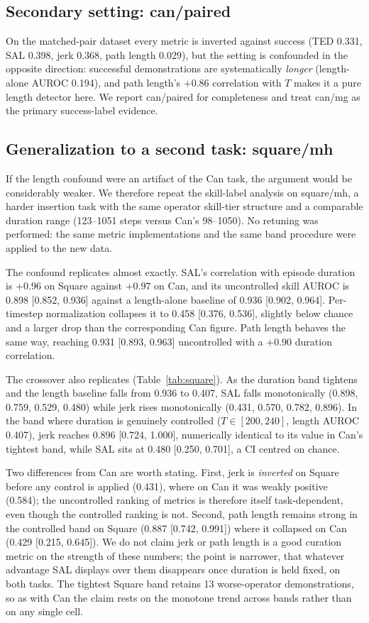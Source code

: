 \documentclass[10pt]{article}
\begin{document}
\subsection{Secondary setting: can/paired}

On the matched-pair dataset every metric is inverted against success (TED
0.331, SAL 0.398, jerk 0.368, path length 0.029), but the setting is
confounded in the opposite direction: successful demonstrations are
systematically \emph{longer} (length-alone AUROC 0.194), and path length's
$+0.86$ correlation with $T$ makes it a pure length detector here. We
report can/paired for completeness and treat can/mg as the primary
success-label evidence.

\subsection{Generalization to a second task: square/mh}
\label{sec:square}

If the length confound were an artifact of the Can task, the argument would
be considerably weaker. We therefore repeat the skill-label analysis on
square/mh, a harder insertion task with the same operator skill-tier
structure and a comparable duration range (123--1051 steps versus Can's
98--1050). No retuning was performed: the same metric implementations and
the same band procedure were applied to the new data.

The confound replicates almost exactly. SAL's correlation with episode
duration is $+0.96$ on Square against $+0.97$ on Can, and its uncontrolled
skill AUROC is 0.898 [0.852, 0.936] against a length-alone baseline of 0.936
[0.902, 0.964]. Per-timestep normalization collapses it to 0.458 [0.376,
0.536], slightly below chance and a larger drop than the corresponding Can
figure. Path length behaves the same way, reaching 0.931 [0.893, 0.963]
uncontrolled with a $+0.90$ duration correlation.

The crossover also replicates (Table~\ref{tab:square}). As the duration band
tightens and the length baseline falls from 0.936 to 0.407, SAL falls
monotonically (0.898, 0.759, 0.529, 0.480) while jerk rises monotonically
(0.431, 0.570, 0.782, 0.896). In the band where duration is genuinely
controlled ($T \in [200,240]$, length AUROC 0.407), jerk reaches 0.896
[0.724, 1.000], numerically identical to its value in Can's tightest band,
while SAL sits at 0.480 [0.250, 0.701], a CI centred on chance.

Two differences from Can are worth stating. First, jerk is \emph{inverted}
on Square before any control is applied (0.431), where on Can it was weakly
positive (0.584); the uncontrolled ranking of metrics is therefore itself
task-dependent, even though the controlled ranking is not. Second, path
length remains strong in the controlled band on Square (0.887 [0.742,
0.991]) where it collapsed on Can (0.429 [0.215, 0.645]). We do not claim
jerk or path length is a good curation metric on the strength of these
numbers; the point is narrower, that whatever advantage SAL displays over
them disappears once duration is held fixed, on both tasks. The tightest
Square band retains 13 worse-operator demonstrations, so as with Can the
claim rests on the monotone trend across bands rather than on any single
cell.
\end{document}
